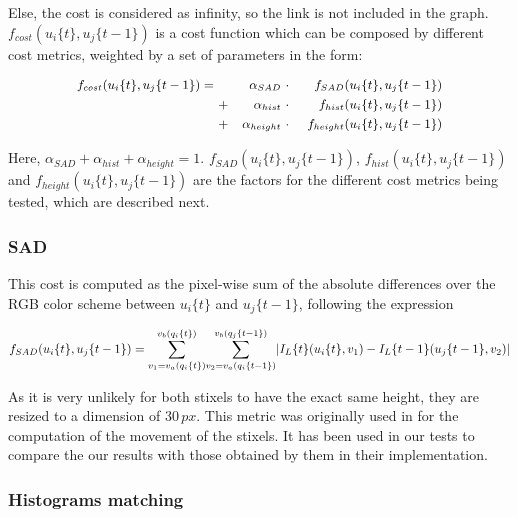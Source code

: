 Else, the cost is considered as infinity, so the link is not included in the graph. $f_{cost}(u_i\{t\}, u_j\{t - 1\})$ is a cost function which can be composed by different cost metrics, weighted by a set of parameters in the form:

\begin{equation}\label{eq:cp04_cost_function}
\small
  \begin{align*}
  f_{cost}(u_i\{t\}, u_j\{t - 1\}) =~  & & \alpha_{SAD} & ~\cdot~ & f_{SAD}(u_i\{t\}, u_j\{t - 1\}) \\
      & + & \alpha_{hist} & ~\cdot~ & f_{hist}(u_i\{t\}, u_j\{t - 1\}) \\
      & + & \alpha_{height} & ~\cdot~ & f_{height}(u_i\{t\}, u_j\{t - 1\})
  \end{align*}
\end{equation}

Here, $\alpha_{SAD} + \alpha_{hist} + \alpha_{height} = 1$. $f_{SAD}(u_i\{t\}, u_j\{t - 1\})$, $f_{hist}(u_i\{t\}, u_j\{t - 1\})$ and $f_{height}(u_i\{t\}, u_j\{t - 1\})$ are the factors for the different cost metrics being tested, which are described next.

\subsubsection{\acf{SAD}}\label{ch:chapter04_01_03_01_01}

This cost is computed as the pixel-wise sum of the absolute differences over the RGB color scheme between $u_i\{t\}$ and $u_j\{t - 1\}$, following the expression

\begin{equation}\label{eq:cp04_stixel_movement_sad_cost}
\tiny
f_{SAD}(u_i\{t\}, u_j\{t - 1\}) = 
\overset{v_b(q_i\{t\})}{\underset{v_1=v_a(q_i\{t\})}{\sum}}
\overset{v_b(q_j\{t - 1\})}{\underset{v_2=v_a(q_i\{t - 1\})}{\sum}}
| I_L\{t\}(u_i\{t\}, v_1) - I_L\{t - 1\}(u_j\{t - 1\}, v_2) |
\end{equation}

As it is very unlikely for both stixels to have the exact same height, they are resized to a dimension of $30\,px$. This metric was originally used in \cite{gunyel2012stixels} for the computation of the movement of the stixels. It has been used in our tests to compare the our results with those obtained by them in their implementation.

\subsubsection{Histograms matching}\label{ch:chapter04_01_03_01_02}

